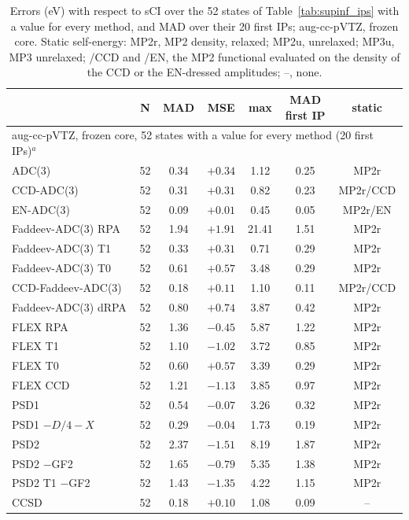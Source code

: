 \begin{table}[hbt!]
\centering
\caption{Errors (eV) with respect to sCI over the 52 states of Table~\ref{tab:supinf_ips} with a value for every method, and MAD over their 20 first IPs; aug-cc-pVTZ, frozen core. Static self-energy: MP2r, MP2 density, relaxed; MP2u, unrelaxed; MP3u, MP3 unrelaxed; /CCD and /EN, the MP2 functional evaluated on the density of the CCD or the EN-dressed amplitudes; --, none.}
\label{tab:supinf_stats}
\footnotesize
\begin{tabular}{lcccccc}
\toprule
 & N & MAD & MSE & max & \makecell{MAD\\first IP} & static \\
\midrule
\multicolumn{7}{l}{aug-cc-pVTZ, frozen core, 52 states with a value for every method (20 first IPs)$^{a}$} \\
\midrule
ADC(3) & 52 & 0.34 & $+0.34$ & 1.12 & 0.25 & MP2r \\
CCD-ADC(3) & 52 & 0.31 & $+0.31$ & 0.82 & 0.23 & MP2r/CCD \\
EN-ADC(3) & 52 & 0.09 & $+0.01$ & 0.45 & 0.05 & MP2r/EN \\
Faddeev-ADC(3) RPA & 52 & 1.94 & $+1.91$ & 21.41 & 1.51 & MP2r \\
Faddeev-ADC(3) T1 & 52 & 0.33 & $+0.31$ & 0.71 & 0.29 & MP2r \\
Faddeev-ADC(3) T0 & 52 & 0.61 & $+0.57$ & 3.48 & 0.29 & MP2r \\
CCD-Faddeev-ADC(3) & 52 & 0.18 & $+0.11$ & 1.10 & 0.11 & MP2r/CCD \\
Faddeev-ADC(3) dRPA & 52 & 0.80 & $+0.74$ & 3.87 & 0.42 & MP2r \\
FLEX RPA & 52 & 1.36 & $-0.45$ & 5.87 & 1.22 & MP2r \\
FLEX T1 & 52 & 1.10 & $-1.02$ & 3.72 & 0.85 & MP2r \\
FLEX T0 & 52 & 0.60 & $+0.57$ & 3.39 & 0.29 & MP2r \\
FLEX CCD & 52 & 1.21 & $-1.13$ & 3.85 & 0.97 & MP2r \\
PSD1 & 52 & 0.54 & $-0.07$ & 3.26 & 0.32 & MP2r \\
PSD1 $-D/4-X$ & 52 & 0.29 & $-0.04$ & 1.73 & 0.19 & MP2r \\
PSD2 & 52 & 2.37 & $-1.51$ & 8.19 & 1.87 & MP2r \\
PSD2 $-$GF2 & 52 & 1.65 & $-0.79$ & 5.35 & 1.38 & MP2r \\
PSD2 T1 $-$GF2 & 52 & 1.43 & $-1.35$ & 4.22 & 1.15 & MP2r \\
CCSD & 52 & 0.18 & $+0.10$ & 1.08 & 0.09 & -- \\

\end{tabular}
\end{table}

